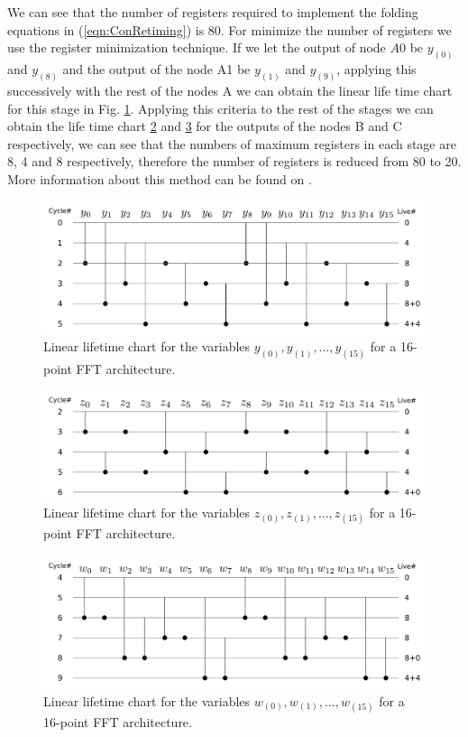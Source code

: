 \documentclass[journal,comsoc]{IEEEtran}
\begin{document}
We can see that the number of registers required to implement the folding equations in (\ref{eqn:ConRetiming}) is 80. For minimize the number of registers we use the register minimization technique. 
If we let the output of node $A0$ be $y_{(0)}$ and $y_{(8)}$ and the output of the node A1 be $y_{(1)}$ and $y_{(9)}$, applying this successively with the rest of the nodes A we can obtain the linear life time chart for this stage in Fig. \ref{fig:tab-life-a}. Applying this criteria to the rest of the stages we can obtain the life time chart \ref{fig:tab-life-b} and \ref{fig:tab-life-c} for the outputs of the nodes B and C respectively, we can see that the numbers of maximum registers in each stage are 8, 4 and 8 respectively, therefore the number of registers is reduced from 80 to 20. More information about this method can be found on \cite{folding_parhi_book}.
\begin{figure}[t!]
\centering
 \includegraphics[width=\linewidth]{Diagramas/life_chart_a.png}
\caption{Linear lifetime chart for the variables $y_{(0)}, y_{(1)},...,y_{(15)}$ for a 16-point FFT architecture.}
\label{fig:tab-life-a}
\end{figure}
\begin{figure}[t!]
\centering
 \includegraphics[width=\linewidth]{Diagramas/life_chart_b.png}
\caption{Linear lifetime chart for the variables $z_{(0)}, z_{(1)},...,z_{(15)}$ for a 16-point FFT architecture.}
\label{fig:tab-life-b}
\end{figure}
\begin{figure}[t!]
\centering
 \includegraphics[width=\linewidth]{Diagramas/life_chart_c.png}
\caption{Linear lifetime chart for the variables $w_{(0)}, w_{(1)},...,w_{(15)}$ for a 16-point FFT architecture.}
\label{fig:tab-life-c}
\end{figure}
\end{document}
